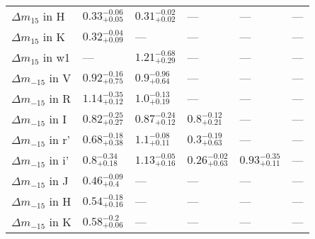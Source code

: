 \begin{longtable}{llllll}
${\Delta m}_{15}$ in H   &  $0.33^{-0.06}_{+0.05}$ &  $0.31^{-0.02}_{+0.02}$ &                     --- &                     --- &                     --- \\
${\Delta m}_{15}$ in K   &  $0.32^{-0.04}_{+0.09}$ &                     --- &                     --- &                     --- &                     --- \\
${\Delta m}_{15}$ in w1  &                     --- &  $1.21^{-0.68}_{+0.29}$ &                     --- &                     --- &                     --- \\
${\Delta m}_{-15}$ in V  &  $0.92^{-0.16}_{+0.75}$ &   $0.9^{-0.96}_{+0.64}$ &                     --- &                     --- &                     --- \\
${\Delta m}_{-15}$ in R  &  $1.14^{-0.35}_{+0.12}$ &   $1.0^{-0.13}_{+0.19}$ &                     --- &                     --- &                     --- \\
${\Delta m}_{-15}$ in I  &  $0.82^{-0.25}_{+0.27}$ &  $0.87^{-0.24}_{+0.12}$ &   $0.8^{-0.12}_{+0.21}$ &                     --- &                     --- \\
${\Delta m}_{-15}$ in r' &  $0.68^{-0.18}_{+0.38}$ &   $1.1^{-0.08}_{+0.11}$ &   $0.3^{-0.19}_{+0.63}$ &                     --- &                     --- \\
${\Delta m}_{-15}$ in i' &   $0.8^{-0.34}_{+0.18}$ &  $1.13^{-0.05}_{+0.16}$ &  $0.26^{-0.02}_{+0.63}$ &  $0.93^{-0.35}_{+0.11}$ &                     --- \\
${\Delta m}_{-15}$ in J  &   $0.46^{-0.09}_{+0.4}$ &                     --- &                     --- &                     --- &                     --- \\
${\Delta m}_{-15}$ in H  &  $0.54^{-0.18}_{+0.16}$ &                     --- &                     --- &                     --- &                     --- \\
${\Delta m}_{-15}$ in K  &   $0.58^{-0.2}_{+0.06}$ &                     --- &                     --- &                     --- &                     --- \\

\end{longtable}
